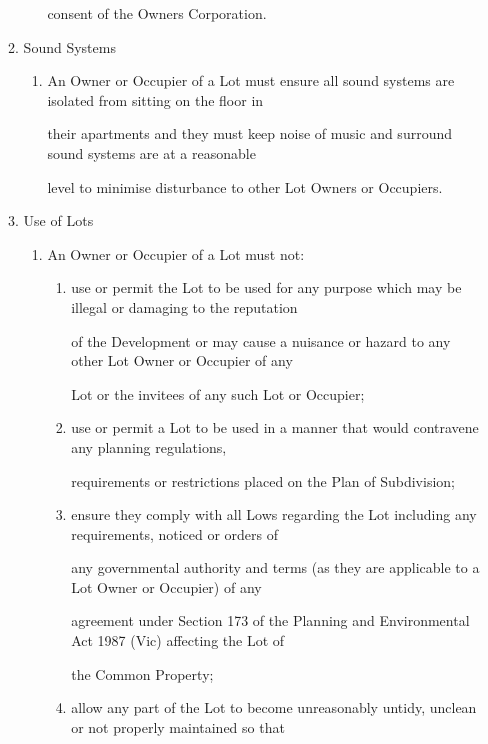 \documentclass{article}
\begin{document}
\begin{enumerate}[label=\arabic*.]
\begin{enumerate}[label=\arabic{enumi}.\arabic*.]
\begin{enumerate}[label=(\arabic*)]
consent of the Owners Corporation. 

\end{enumerate}
\item  Sound Systems 

\begin{enumerate}[label=(\arabic*)]
\item  An Owner or Occupier of a Lot must ensure all sound systems are isolated from sitting on the floor in 

their apartments and they must keep noise of music and surround sound systems are at a reasonable 

level to minimise disturbance to other Lot Owners or Occupiers. 

\end{enumerate}
\item  Use of Lots 

\begin{enumerate}[label=(\arabic*)]
\item  An Owner or Occupier of a Lot must not: 

\begin{enumerate}[label=(\alph*)]
\item  use or permit the Lot to be used for any purpose which may be illegal or damaging to the reputation 

of the Development or may cause a nuisance or hazard to any other Lot Owner or Occupier of any 

Lot or the invitees of any such Lot or Occupier; 

\item  use or permit a Lot to be used in a manner that would contravene any planning regulations, 

requirements or restrictions placed on the Plan of Subdivision; 

\item  ensure they comply with all Lows regarding the Lot including any requirements, noticed or orders of 

any governmental authority and terms (as they are applicable to a Lot Owner or Occupier) of any 

agreement under Section 173 of the Planning and Environmental Act 1987 (Vic) affecting the Lot of 

the Common Property; 

\item  allow any part of the Lot to become unreasonably untidy, unclean or not properly maintained so that 


\end{enumerate}
\end{enumerate}
\end{enumerate}
\end{enumerate}
\end{document}
